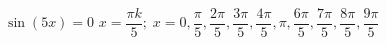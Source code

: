 { $\sin \left( 5x \right) = 0$ }
{ $x = \dfrac{\pi k}{5}; \; x = 0, \dfrac{\pi}{5}, \dfrac{2\pi}{5}, \dfrac{3\pi}{5}, \dfrac{4\pi}{5}, \pi, \dfrac{6\pi}{5}, \dfrac{7\pi}{5}, \dfrac{8\pi}{5}, \dfrac{9\pi}{5}$}
